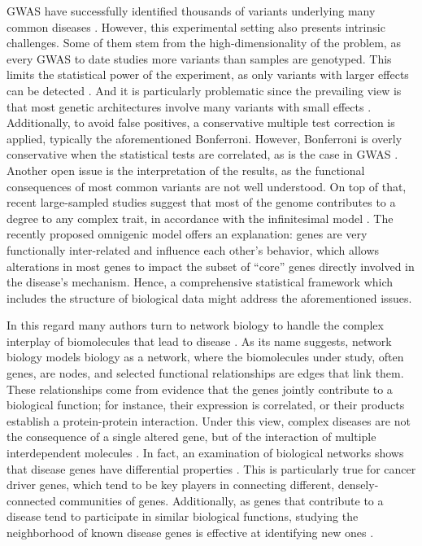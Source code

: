 \documentclass[twocolumn, 11pt]{article}
\begin{document}
GWAS have successfully identified thousands of variants underlying many common diseases \cite{buniello_nhgri-ebi_2019}. However, this experimental setting also presents intrinsic challenges. Some of them stem from the high-dimensionality of the problem, as every GWAS to date studies more variants than samples are genotyped. This limits the statistical power of the experiment, as only variants with larger effects can be detected \cite{visscher_10_2017}. And it is particularly problematic since the prevailing view is that most genetic architectures involve many variants with small effects \cite{visscher_10_2017}. Additionally, to avoid false positives, a conservative multiple test correction is applied, typically the aforementioned Bonferroni. However, Bonferroni is overly conservative when the statistical tests are correlated, as is the case in GWAS \cite{wang_statistical_2018}. Another open issue is the interpretation of the results, as the functional consequences of most common variants are not well understood. On top of that, recent large-sampled studies suggest that most of the genome contributes to a degree to any complex trait, in accordance with the infinitesimal model \cite{barton_infinitesimal_2017}. The recently proposed omnigenic model \cite{boyle_expanded_2017} offers an explanation: genes are very functionally inter-related and influence each other's behavior, which allows alterations in most genes to impact the subset of ``core'' genes directly involved in the disease's mechanism. Hence, a comprehensive statistical framework which includes the structure of biological data might address the aforementioned issues.

In this regard many authors turn to network biology to handle the complex interplay of biomolecules that lead to disease \cite{furlong_human_2013}. As its name suggests, network biology models biology as a network, where the biomolecules under study, often genes, are nodes, and selected functional relationships are edges that link them. These relationships come from evidence that the genes jointly contribute to a biological function; for instance, their expression is correlated, or their products establish a protein-protein interaction. Under this view, complex diseases are not the consequence of a single altered gene, but of the interaction of multiple interdependent molecules \cite{barabasi_network_2011}. In fact, an examination of biological networks shows that disease genes have differential properties \cite{barabasi_network_2011,pinero_uncovering_2016}. This is particularly true for cancer driver genes, which tend to be key players in connecting different, densely-connected communities of genes. Additionally, as genes that contribute to a disease tend to participate in similar biological functions, studying the neighborhood of known disease genes is effective at identifying new ones \cite{huang_systematic_2018}. 
\end{document}
